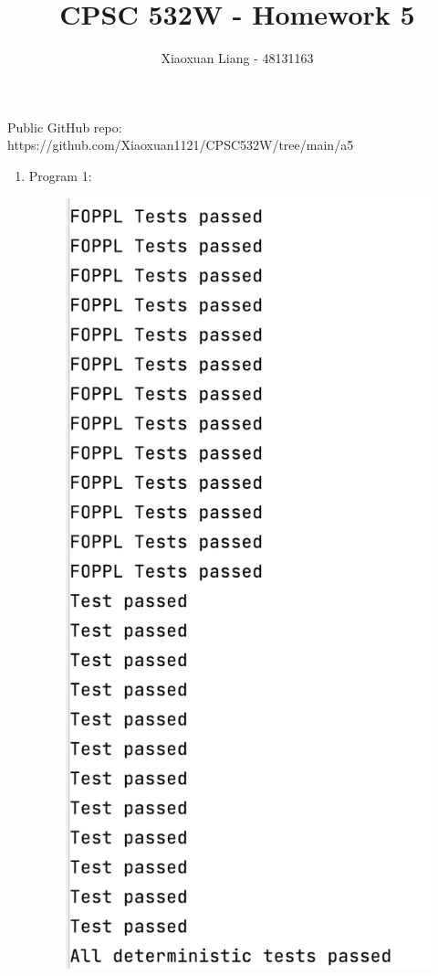 \documentclass{article}
\title{ \normalfont \normalsize 
\huge CPSC 532W - Homework 5}
\date{}
\author{Xiaoxuan Liang - 48131163}
\begin{document}
\maketitle
Public GitHub repo: https://github.com/Xiaoxuan1121/CPSC532W/tree/main/a5
\begin{enumerate}
\item Program 1:

\begin{figure}[!ht]
	\centering
	\includegraphics[scale=0.5]{../figs/deterministic_tests}
\end{figure}


\end{enumerate}
\end{document}
